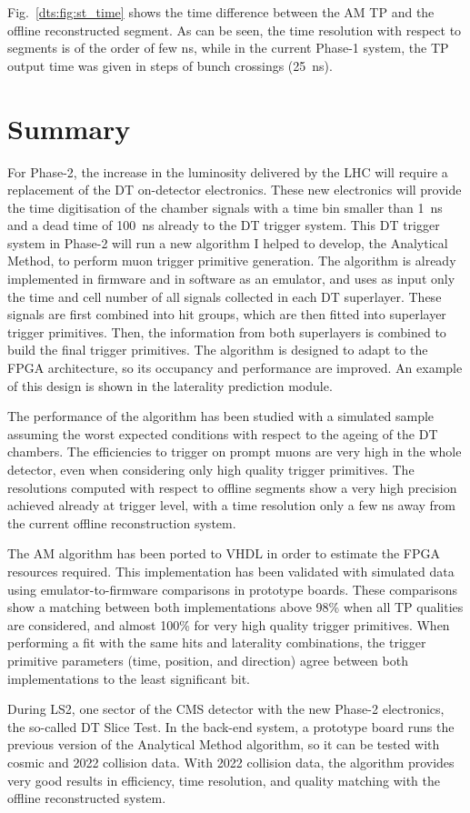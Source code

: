 \documentclass[../main.tex]{subfiles}
\begin{document}
Fig.~\ref{dts:fig:st_time} shows the time difference between the AM TP and the offline reconstructed segment. As can be seen, the time resolution with respect to segments is of the order of few ns, while in the current Phase-1 system, the TP output time was given in steps of bunch crossings (25~ns).


\section{Summary}

For Phase-2, the increase in the luminosity delivered by the LHC will require a replacement of the DT on-detector electronics. These new electronics will provide the time digitisation of the chamber signals with a time bin smaller than 1~ns and a dead time of 100~ns already to the DT trigger system. This DT trigger system in Phase-2 will run a new algorithm I helped to develop, the Analytical Method, to perform muon trigger primitive generation. The algorithm is already implemented in firmware and in software as an emulator, and uses as input only the time and cell number of all signals collected in each DT superlayer. These signals are first combined into hit groups, which are then fitted into superlayer trigger primitives. Then, the information from both superlayers is combined to build the final trigger primitives. The algorithm is designed to adapt to the FPGA architecture, so its occupancy and performance are improved. An example of this design is shown in the laterality prediction module.

The performance of the algorithm has been studied with a simulated sample assuming the worst expected conditions with respect to the ageing of the DT chambers. The efficiencies to trigger on prompt muons are very high in the whole detector, even when considering only high quality trigger primitives. The resolutions computed with respect to offline segments show a very high precision achieved already at trigger level, with a time resolution only a few ns away from the current offline reconstruction system.

The AM algorithm has been ported to VHDL in order to estimate the FPGA resources required. This implementation has been validated with simulated data using emulator-to-firmware comparisons in prototype boards. These comparisons show a matching between both implementations above 98\% when all TP qualities are considered, and almost 100\% for very high quality trigger primitives. When performing a fit with the same hits and laterality combinations, the trigger primitive parameters (time, position, and direction) agree between both implementations to the least significant bit.

During LS2, one sector of the CMS detector with the new Phase-2 electronics, the so-called DT Slice Test. In the back-end system, a prototype board runs the previous version of the Analytical Method algorithm, so it can be tested with cosmic and 2022 collision data. With 2022 collision data, the algorithm provides very good results in efficiency, time resolution, and quality matching with the offline reconstructed system.




%
%
\end{document}

